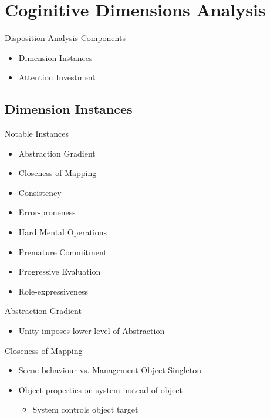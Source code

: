 \section{Coginitive Dimensions Analysis}
\begin{frame}{\secname}{Disposition}
	Analysis Components
	\begin{itemize}
		\item Dimension Instances
		\item Attention Investment
	\end{itemize}
\end{frame}

\subsection{Dimension Instances}
\begin{frame}{\secname}{\subsecname}
	Notable Instances
	\begin{itemize}
		\item Abstraction Gradient
		\item Closeness of Mapping
		\item Consistency
		\item Error-proneness
		\item Hard Mental Operations
		\item Premature Commitment
		\item Progressive Evaluation
		\item Role-expressiveness
	\end{itemize}
\end{frame}

\begin{frame}{\secname}{\subsecname}
	Abstraction Gradient
	\begin{itemize}
		\item Unity imposes lower level of Abstraction
	\end{itemize}
\end{frame}

\begin{frame}{\secname}{\subsecname}
	Closeness of Mapping
	\begin{itemize}
		\item Scene behaviour vs. Management Object Singleton
		\item Object properties on system instead of object
		\begin{itemize}
			\item System controls object target
		\end{itemize}
	\end{itemize}
\end{frame}

